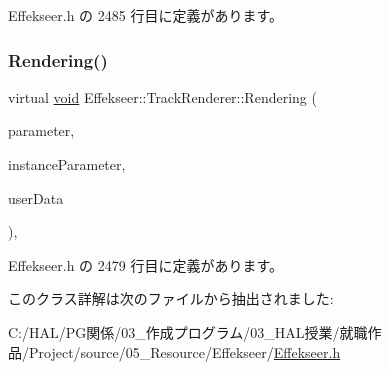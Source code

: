  Effekseer.\+h の 2485 行目に定義があります。

\mbox{\label{class_effekseer_1_1_track_renderer_a5d99f7a58b254166cf938bc739bbb387}} 
\subsubsection{\texorpdfstring{Rendering()}{Rendering()}}
{\footnotesize\ttfamily virtual \mbox{\hyperlink{namespace_effekseer_ab34c4088e512200cf4c2716f168deb56}{void}} Effekseer\+::\+Track\+Renderer\+::\+Rendering (\begin{DoxyParamCaption}\item[{const \mbox{\hyperlink{struct_effekseer_1_1_track_renderer_1_1_node_parameter}{Node\+Parameter}} \&}]{parameter,  }\item[{const \mbox{\hyperlink{struct_effekseer_1_1_track_renderer_1_1_instance_parameter}{Instance\+Parameter}} \&}]{instance\+Parameter,  }\item[{\mbox{\hyperlink{namespace_effekseer_ab34c4088e512200cf4c2716f168deb56}{void}} $\ast$}]{user\+Data }\end{DoxyParamCaption})\hspace{0.3cm}{\ttfamily [inline]}, {\ttfamily [virtual]}}



 Effekseer.\+h の 2479 行目に定義があります。



このクラス詳解は次のファイルから抽出されました\+:\begin{DoxyCompactItemize}
\item 
C\+:/\+H\+A\+L/\+P\+G関係/03\+\_\+作成プログラム/03\+\_\+\+H\+A\+L授業/就職作品/\+Project/source/05\+\_\+\+Resource/\+Effekseer/\mbox{\hyperlink{_effekseer_8h}{Effekseer.\+h}}\end{DoxyCompactItemize}

